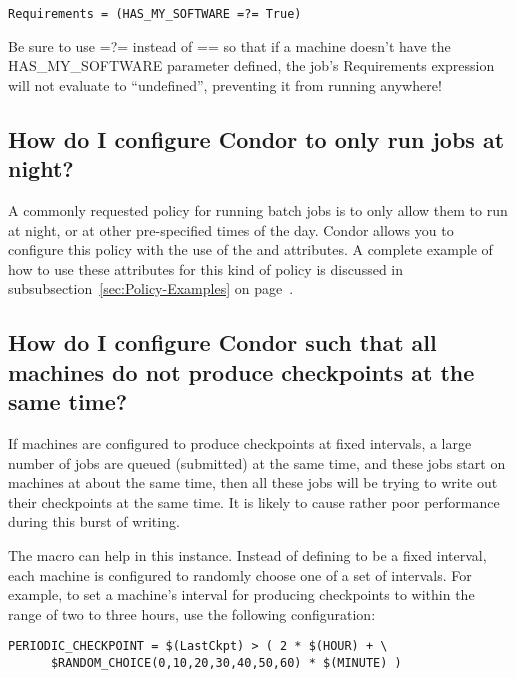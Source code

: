 \footnotesize
\begin{verbatim}
Requirements = (HAS_MY_SOFTWARE =?= True)
\end{verbatim}
\normalsize

\Note Be sure to use =?= instead of == so that if a machine doesn't have
the HAS\_MY\_SOFTWARE parameter defined, the job's Requirements
expression will not evaluate to ``undefined'', preventing it from
running anywhere!


\subsection*{How do I configure Condor to only run jobs at night?}

A commonly requested policy for running batch jobs is to only allow
them to run at night, or at other pre-specified times of the day.
Condor allows you to configure this policy with the use of the
 and   attributes.  
A complete example of how to use these attributes for this kind of
policy is discussed in subsubsection~\ref{sec:Policy-Examples} on
page~\pageref{sec:Policy-Examples}.


\subsection*{How do I configure Condor such that all machines do not produce checkpoints at the same time?}
\label{sec:randomchoiceusage}
If machines are configured to produce checkpoints at fixed intervals,
a large number of jobs are queued (submitted) at the same time,
and these jobs start on machines at about the same time,
then all these jobs will be trying to write out their checkpoints
at the same time.
It is likely to cause rather poor performance during this burst of
writing.

The  macro can help in this instance.
Instead of defining  to be a fixed
interval, each machine is configured to randomly choose 
one of a set of intervals.
For example, to set a machine's interval for producing checkpoints
to within the range of two to three hours, use the following
configuration:
\footnotesize
\begin{verbatim}
PERIODIC_CHECKPOINT = $(LastCkpt) > ( 2 * $(HOUR) + \
      $RANDOM_CHOICE(0,10,20,30,40,50,60) * $(MINUTE) )
\end{verbatim}
\normalsize

